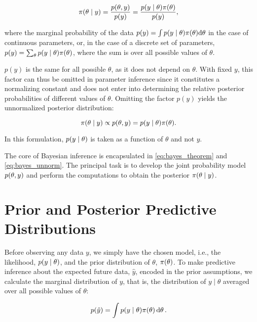 \begin{equation}\label{eq:bayes_theorem}
    \pi \qty(\theta \mid y) = \frac{p(\theta, y)}{p(y)}  = \frac{p \qty(y \mid \theta) \pi \qty(\theta)}{p(y)},
\end{equation}

where the marginal probability of the data $p(y) = \int p \qty(y \mid \theta) \pi \qty(\theta) \dd \theta$ in the case of continuous parameters, or, in the case of a discrete set of parameters, $p(y) = \sum_\theta p \qty(y \mid \theta) \pi \qty(\theta)$, where the sum is over all possible values of $\theta$.

$p(y)$ is the same for all possible $\theta$, as it does not depend on $\theta$. With fixed $y$, this factor can thus be omitted in parameter inference since it constitutes a normalizing constant and does not enter into determining the relative posterior probabilities of different values of $\theta$. Omitting the factor $p(y)$ yields the unnormalized posterior distribution: 

\begin{equation}\label{eq:bayes_unnorm}
    \pi \qty(\theta \mid y) \propto p(\theta, y) =  p \qty(y \mid \theta) \pi \qty(\theta) .
\end{equation}

In this formulation, $p \qty(y \mid \theta)$ is taken as a function of $\theta$ and not $y$.  

The core of Bayesian inference is encapsulated in \autoref{eq:bayes_theorem} and \autoref{eq:bayes_unnorm}. The principal task is to develop the joint probability model $p(\theta, y)$ and perform the computations to obtain the posterior $\pi \qty(\theta \mid y)$.


\section{Prior and Posterior Predictive Distributions}\label{sec:predictive_dist}

Before observing any data $y$, we simply have the chosen model, i.e., the likelihood, $p \qty(y \mid \theta)$, and the prior distribution of $\theta$, $\pi \qty(\theta)$. To make predictive inference about the expected future data, $\hat{y}$, encoded in the prior assumptions, we calculate the marginal distribution of $y$, that is, the distribution of $y \mid \theta$ averaged over all possible values of $\theta$:

\begin{equation}\label{eq:prior_pred}
    p \qty(\hat{y}) = \int p \qty(y \mid \theta) \pi \qty(\theta) \dd{\theta}.
\end{equation}

